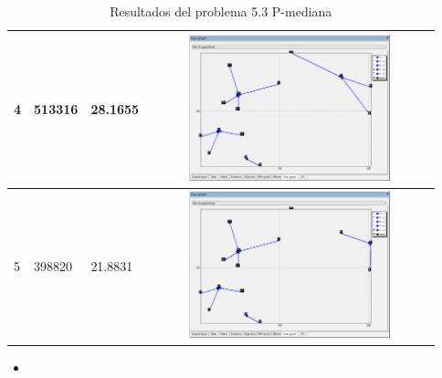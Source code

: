 \documentclass[a4paper,11pt]{article}
\begin{document}
\begin{table}[!htbp]
\begin{tabular}{|l|p{2cm}|p{2cm}|p{8cm}|}
4	& 513316	& 28.1655	& \includegraphics[width=8cm, height=4.25cm]{images/5_3_p4.png}	\\ \hline
5	& 398820	& 21.8831	& \includegraphics[width=8cm, height=4.25cm]{images/5_3_p5.png}	\\ \hline
\end{tabular}
\caption{Resultados del problema 5.3 P-mediana}
\end{table}

\begin{itemize}\item[]

\end{itemize}
\end{document}
